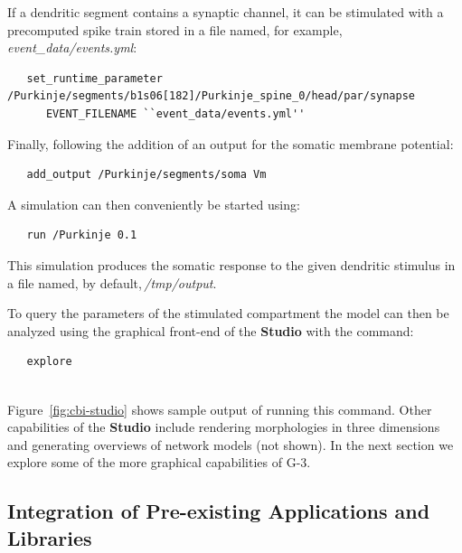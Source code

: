 \documentclass[10pt]{article}
\begin{document}
If a dendritic segment contains a synaptic channel, it can be
stimulated with a precomputed spike train stored in a file named, for
example,\,{\it event\_data/events.yml}:

\begin{verbatim}
   set_runtime_parameter /Purkinje/segments/b1s06[182]/Purkinje_spine_0/head/par/synapse
      EVENT_FILENAME ``event_data/events.yml''
\end{verbatim}

Finally, following the addition of an output for the somatic membrane potential:
\begin{verbatim}
   add_output /Purkinje/segments/soma Vm
\end{verbatim}
A simulation can then conveniently be started using:
\begin{verbatim}
   run /Purkinje 0.1
\end{verbatim}
This simulation produces the somatic response to the given dendritic stimulus in a file named, by default,\,{\it /tmp/output}.

To query the parameters of the stimulated compartment the model can
then be analyzed using the graphical front-end of the {\bf Studio}
with the command:

\begin{verbatim}
   explore
\end{verbatim}

\\

Figure~\ref{fig:cbi-studio} shows sample output of running this
command.  Other capabilities of the {\bf Studio} include rendering
morphologies in three dimensions and generating overviews of network
models (not shown).  In the next section we explore some of the more graphical
capabilities of G-3.

\subsection*{Integration of Pre-existing Applications and Libraries}
\end{document}
